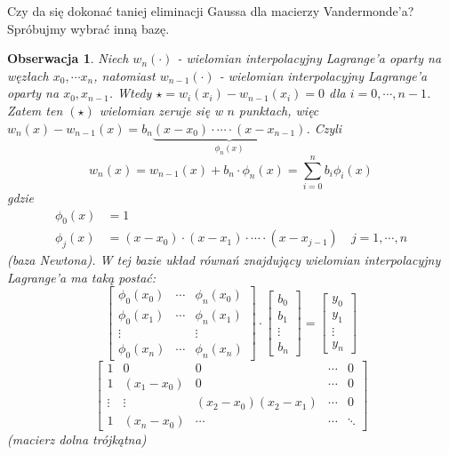 \documentclass[hidelinks,a4paper,fleqn,oneside]{book}
\newtheorem{obserw}{Obserwacja}
\begin{document}
Czy da się dokonać taniej eliminacji Gaussa dla macierzy Vandermonde'a? Spróbujmy wybrać inną bazę.

\begin{obserw}
Niech $w_n(\cdot)$ - wielomian interpolacyjny Lagrange'a oparty na węzłach $x_0, \cdots x_n$, natomiast $w_{n-1}(\cdot)$ - wielomian interpolacyjny Lagrange'a oparty na $x_0, x_{n-1}$. Wtedy $\star = w_i(x_i) - w_{n-1}(x_i) = 0$ dla $i=0, \cdots, n-1$. Zatem ten $(\star)$ wielomian zeruje się w $n$ punktach, więc $w_n(x) - w_{n-1}(x) = b_n\underbrace{(x-x_0)\cdot \cdots \cdot (x-x_{n-1})}_{\phi_n(x)}$. Czyli
\[
	w_n(x) = w_{n-1}(x) + b_n\cdot\phi_n(x) = \sum_{i=0}^{n} b_i\phi_i(x)
\]
gdzie 
\begin{align*}
    \phi_0(x) & = 1\\
    \phi_j(x) & = (x-x_0) \cdot (x-x_1) \cdot \cdots \cdot (x - x_{j-1}) \quad j=1, \cdots, n
\end{align*}
(baza Newtona). W tej bazie układ równań znajdujący wielomian interpolacyjny Lagrange'a ma taką postać:
\[
\left[
	\begin{array}{ccc}
		\phi_0(x_0) & \cdots & \phi_n(x_0) \\
		\phi_0(x_1) & \cdots & \phi_n(x_1) \\
		\vdots & & \vdots \\
		\phi_0(x_n) & \cdots & \phi_n(x_n)
	\end{array}
\right]
\cdot
\left[
	\begin{array}{c}
		b_0 \\
		b_1 \\
		\vdots \\
		b_n
	\end{array}
\right]
=
\left[
	\begin{array}{c}
		y_0 \\
		y_1 \\
		\vdots \\
		y_n
	\end{array}
\right]
\]
\[
\left[
\begin{array}{ccccc}
1 & 0 & 0 & \cdots & 0 \\
1 & (x_1 - x_0) & 0 & \cdots & 0 \\
\vdots & \vdots & (x_2 - x_0)(x_2 - x_1) & \cdots & 0 \\
1 & (x_n - x_0) & \cdots & \cdots & \ddots
\end{array}
\right]
\]
(macierz dolna trójkątna)
\end{obserw}
\end{document}

